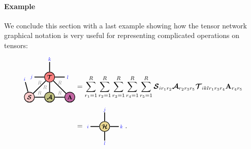 \paragraph{Example} We conclude this section with a last example showing how the tensor network graphical notation is very useful for representing complicated operations on tensors:
\begin{align}\label{eq:einsum}
\begin{tikzpicture}[baseline = \baseline]
    \tikzset{tensor/.style = {minimum size = 0.5cm,shape = circle,thick,draw=black,inner sep = 0pt}, edge/.style = 
    {thick,line width=.4mm},every loop/.style={}}
    \def\y{-0.5}
    \def\x{0}
    \node[tensor,fill=green!50!red!50!white] (At) at (\x,\y){\scalebox{0.85}{$\At$}};
    \node[tensor,fill=red!20!white] (S) at (\x-1,\y){\scalebox{0.85}{$\St$}};
    \node[tensor,fill=red!50!white] (Tt) at (\x,\y+1){\scalebox{0.85}{$\Tt$}};
    \node[tensor,fill=blue!40!red!60!white] (A) at (\x+1,\y){\scalebox{0.85}{$\Ab$}};
    \draw[edge] (Tt) -- (At) node [midway,left] {\scalebox{0.7}{\dimcolor{$R$}}};
    \draw[edge] (Tt) -- (A) node [above,midway] {\scalebox{0.7}{\dimcolor{$R$}}};
    \draw[edge] (At) -- (A)  node [midway,above] {\scalebox{0.7}{\dimcolor{$R$}}};
    \draw[edge] (Tt) -- (\x,\y+1.75) node [pos=1.3] {\scalebox{0.7}{\indcolor{$k$}}};
    \draw[edge] (At) -- (S)  node [midway,above] {\scalebox{0.7}{\dimcolor{$R$}}};
    \draw[edge] (S) -- (Tt)  node [midway,above] {\scalebox{0.7}{\dimcolor{$R$}}};
    \draw[edge] (Tt) -- (\x-0.75,\y+1)  node [pos=1.3] {\scalebox{0.7}{\indcolor{$j$}}};
    \draw[edge] (Tt) -- (\x+0.75,\y+1)  node [pos=1.3] {\scalebox{0.7}{\indcolor{$l$}}};
    \draw[edge] (S) -- (\x-1.2,\y+0.75)  node [pos=1.3] {\scalebox{0.7}{\indcolor{$i$}}};
    \end{tikzpicture}
&=
\sum_{r_1=1}^R\sum_{r_2=1}^R\sum_{r_3=1}^R\sum_{r_4=1}^R\sum_{r_5=1}^R\St_{ir_1 r_2}\At_{r_2r_3r_5}\Tt_{iklr_1r_3r_4}\Ab_{r_4r_5}\nonumber\\
&=
    \begin{tikzpicture}[baseline = \baseline]
    \tikzset{tensor/.style = {minimum size = 0.5cm,shape = circle,thick,draw=black,inner sep = 0pt}, edge/.style = 
    {thick,line width=.4mm},every loop/.style={}}
    \def\y{0}
    \def\x{0}
    \node[tensor,fill=blue!50!red!30!yellow!50!white] (Ht) at (\x,\y){\scalebox{0.85}{$\Ht$}};
    \draw[edge](Ht) -- (\x,\y+0.7) node [pos=1.3] {\scalebox{0.7}{\indcolor{$j$}}};
    \draw[edge](Ht) -- (\x,\y-0.7) node [pos=1.3] {\scalebox{0.7}{\indcolor{$l$}}};
    \draw[edge](Ht) -- (\x-0.7,\y) node [pos=1.3] {\scalebox{0.7}{\indcolor{$i$}}};
    \draw[edge](Ht) -- (\x+0.7,\y) node[pos=1.3] {\scalebox{0.7}{\indcolor{$k$}}};
    \end{tikzpicture}.
\end{align}
